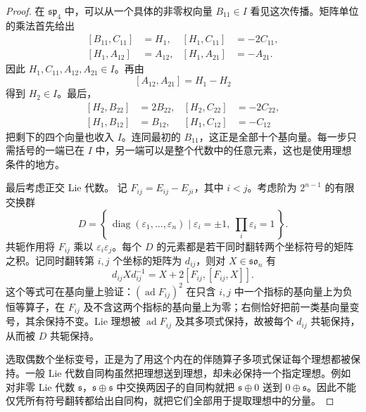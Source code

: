 \begin{proof}
	在 \(\mathfrak{sp}_4\) 中，可以从一个具体的非零权向量 \(B_{11}\in I\) 看见这次传播。矩阵单位的乘法首先给出
	\[
		\begin{aligned}
			[B_{11},C_{11}]&=H_1,&[H_1,C_{11}]&=-2C_{11},\\
			[H_1,A_{12}]&=A_{12},&[H_1,A_{21}]&=-A_{21}.
		\end{aligned}
	\]
	因此 \(H_1,C_{11},A_{12},A_{21}\in I\)。再由
	\[
		[A_{12},A_{21}]=H_1-H_2
	\]
	得到 \(H_2\in I\)。最后，
	\[
		\begin{aligned}
			[H_2,B_{22}]&=2B_{22},&[H_2,C_{22}]&=-2C_{22},\\
			[H_1,B_{12}]&=B_{12},&[H_1,C_{12}]&=-C_{12}
		\end{aligned}
	\]
	把剩下的四个向量也收入 \(I\)。连同最初的 \(B_{11}\)，这正是全部十个基向量。每一步只需括号的一端已在 \(I\) 中，另一端可以是整个代数中的任意元素，这也是使用理想条件的地方。

	最后考虑正交 Lie 代数。 记 \(F_{ij}=E_{ij}-E_{ji}\)，其中 \(i<j\)。考虑阶为 \(2^{n-1}\) 的有限交换群
	\[
		D=\left\{\,\operatorname{diag}(\varepsilon_1,\ldots,\varepsilon_n) \mid\varepsilon_i=\pm1,\ \prod_i\varepsilon_i=1\,\right\}.
	\]
	共轭作用将 \(F_{ij}\) 乘以 \(\varepsilon_i\varepsilon_j\)。每个 \(D\) 的元素都是若干同时翻转两个坐标符号的矩阵之积。记同时翻转第 \(i,j\) 个坐标的矩阵为 \(d_{ij}\)，则对 \(X\in\mathfrak{so}_n\) 有
	\[
		d_{ij}Xd_{ij}^{-1}=X+2[F_{ij},[F_{ij},X]].
	\]
	这个等式可在基向量上验证：\((\operatorname{ad}F_{ij})^2\) 在只含 \(i,j\) 中一个指标的基向量上为负恒等算子，在 \(F_{ij}\) 及不含这两个指标的基向量上为零；右侧恰好把前一类基向量变号，其余保持不变。Lie 理想被 \(\operatorname{ad}F_{ij}\) 及其多项式保持，故被每个 \(d_{ij}\) 共轭保持，从而被 \(D\) 共轭保持。

	选取偶数个坐标变号，正是为了用这个内在的伴随算子多项式保证每个理想都被保持。一般 Lie 代数自同构虽然把理想送到理想，却未必保持一个指定理想。例如对非零 Lie 代数 \(\mathfrak s\)，\(\mathfrak s\oplus\mathfrak s\) 中交换两因子的自同构就把 \(\mathfrak s\oplus0\) 送到 \(0\oplus\mathfrak s\)。因此不能仅凭所有符号翻转都给出自同构，就把它们全部用于提取理想中的分量。


\end{proof}
